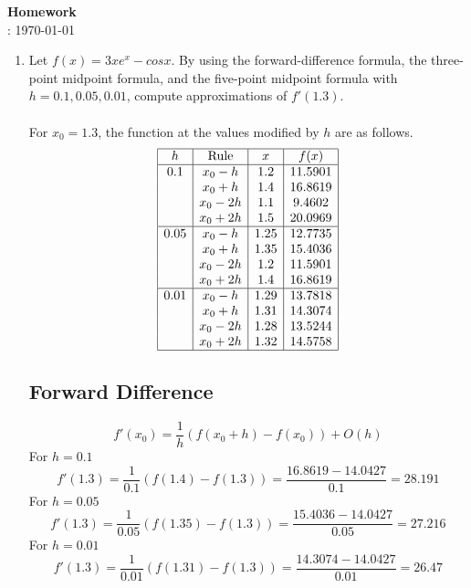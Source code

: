 \documentclass[12pt]{article}
\title{}
\author{Josh Morales}
\date{\today}
\begin{document}
\pagestyle{fancy}
\begin{center}
\textbf{\Large Homework } \\
: \today
\end{center}
\begin{enumerate}[leftmargin=2em]
    \item Let $f (x) = 3xe^x - cos x$. By using the forward-difference formula, the three-point
    midpoint formula, and the five-point midpoint formula with $h = 0.1, 0.05,
    0.01$, compute approximations of $f'(1.3)$.\\
    \\For $x_0=1.3$, the function at the values modified by $h$ are as follows.
    \[
    \begin{array}{|c|c|c|c|}
    \hline
    h & \text{Rule} & x & f(x) \\
    \hline
    0.1  & x_0 - h  & 1.2  & 11.5901  \\
         & x_0 + h  & 1.4  & 16.8619  \\
         & x_0 - 2h & 1.1  & 9.4602   \\
         & x_0 + 2h & 1.5  & 20.0969  \\
    \hline
    0.05 & x_0 - h  & 1.25 & 12.7735  \\
         & x_0 + h  & 1.35 & 15.4036  \\
         & x_0 - 2h & 1.2  & 11.5901  \\
         & x_0 + 2h & 1.4  & 16.8619  \\
    \hline
    0.01 & x_0 - h  & 1.29 & 13.7818  \\
         & x_0 + h  & 1.31 & 14.3074  \\
         & x_0 - 2h & 1.28 & 13.5244  \\
         & x_0 + 2h & 1.32 & 14.5758  \\
    \hline
    \end{array}
    \]
    
    \subsection*{Forward Difference}
    \[
    f'(x_0) = \frac{1}{h}(f(x_0+h)-f(x_0)) + O(h)
    \]
    For $h = 0.1$
    \[
    f'(1.3) = \frac{1}{0.1}(f(1.4)-f(1.3)) = \frac{16.8619-14.0427}{0.1} = 28.191
    \]
    For $h = 0.05$
    \[
    f'(1.3) = \frac{1}{0.05}(f(1.35)-f(1.3)) = \frac{15.4036-14.0427}{0.05} = 27.216
    \]
    For $h=0.01$
    \[
    f'(1.3) = \frac{1}{0.01}(f(1.31)-f(1.3)) = \frac{14.3074-14.0427}{0.01} = 26.47
    \]

\end{enumerate}
\end{document}
